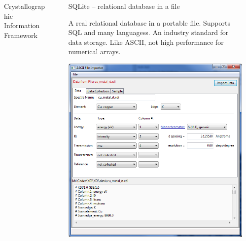 \documentclass[final]{beamer}
\begin{document}
\begin{frame}{}
\begin{columns}[t]
\begin{column}{.34\linewidth}
\begin{block}{Crystallographic Information Framework}
         \vspace{10mm} {\ }  \vspace{10mm} {\ }

        \end{block}
      \end{column}
      \begin{column}{.01\linewidth}
      \end{column}
      \begin{column}{.31\linewidth}
        \begin{block}{SQLite -- relational database in a file}

          \justifying A real relational database in a portable file. Supports
          SQL and many languagess.  An industry standard for
          data storage. Like ASCII, not high performance for numerical
          arrays.

         \vspace{6mm}

         \begin{center}
           \includegraphics[width=0.7\linewidth]{sqlite.png}
         \end{center}

         \vspace{10mm} {\ }   \vspace{10mm} {\ }


        \end{block}
      \end{column}
      \begin{column}{.01\linewidth}
      \end{column}

    \end{columns}
  \end{frame}
\end{document}
